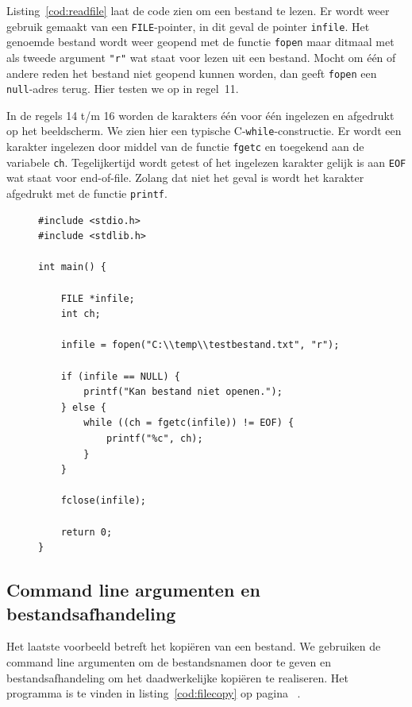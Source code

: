 \documentclass[a4paper,10pt,fleqn,twoside]{article}
\begin{document}
Listing~\ref{cod:readfile} laat de code zien om een bestand te lezen. Er wordt weer gebruik gemaakt van een \lstinline|FILE|-pointer, in dit geval de pointer \lstinline|infile|.  Het genoemde bestand wordt weer geopend met de functie \lstinline|fopen| maar ditmaal met als tweede argument \lstinline|"r"| wat staat voor lezen uit een bestand. Mocht om \'e\'en of andere reden het bestand niet geopend kunnen worden, dan geeft \lstinline|fopen| een \lstinline|null|-adres terug. Hier testen we op in regel~11.

In de regels 14 t/m 16 worden de karakters \'e\'en voor \'e\'en ingelezen en afgedrukt op het beeldscherm. We zien hier een typische C-\lstinline|while|-constructie.  Er wordt een karakter ingelezen door middel van de functie \lstinline|fgetc| en toegekend aan de variabele \lstinline|ch|. Tegelijkertijd wordt getest of het ingelezen karakter gelijk is aan \lstinline|EOF| wat staat voor end-of-file. Zolang dat niet het geval is wordt het karakter afgedrukt met de functie \lstinline|printf|.

\begin{figure}[!t]
\begin{lstlisting}[caption=Voorbeeld lezen uit een bestand.,label=cod:readfile]
#include <stdio.h>
#include <stdlib.h>
	
int main() {

	FILE *infile;
	int ch;
	
	infile = fopen("C:\\temp\\testbestand.txt", "r");
	
	if (infile == NULL) {
		printf("Kan bestand niet openen.");
	} else {
		while ((ch = fgetc(infile)) != EOF) {
			printf("%c", ch);
		}
	}
	
	fclose(infile);
	
	return 0;
}
\end{lstlisting}
\end{figure}

\subsection{Command line argumenten en bestandsafhandeling}
Het laatste voorbeeld betreft het kopi\"eren van een bestand. We gebruiken de command line argumenten om de bestandsnamen door te geven en bestandsafhandeling om het daadwerkelijke kopi\"eren te realiseren. Het programma is te vinden in listing~\ref{cod:filecopy} op pagina~\pageref{cod:filecopy} .
\end{document}
